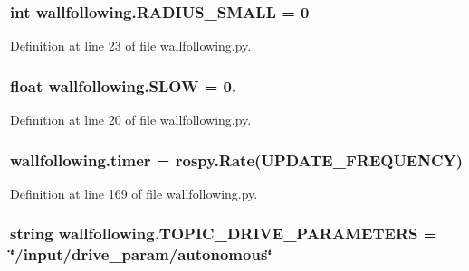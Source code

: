 \subsubsection[{\texorpdfstring{R\+A\+D\+I\+U\+S\+\_\+\+S\+M\+A\+LL}{RADIUS_SMALL}}]{\setlength{\rightskip}{0pt plus 5cm}int wallfollowing.\+R\+A\+D\+I\+U\+S\+\_\+\+S\+M\+A\+LL = 0}\hypertarget{namespacewallfollowing_aa59c6dfd10cb4f1550367b3268417436}{}\label{namespacewallfollowing_aa59c6dfd10cb4f1550367b3268417436}


Definition at line 23 of file wallfollowing.\+py.

\subsubsection[{\texorpdfstring{S\+L\+OW}{SLOW}}]{\setlength{\rightskip}{0pt plus 5cm}float wallfollowing.\+S\+L\+OW = 0.}\hypertarget{namespacewallfollowing_a30a4013dbd3a6ea5275fbed3fe35da22}{}\label{namespacewallfollowing_a30a4013dbd3a6ea5275fbed3fe35da22}


Definition at line 20 of file wallfollowing.\+py.

\subsubsection[{\texorpdfstring{timer}{timer}}]{\setlength{\rightskip}{0pt plus 5cm}wallfollowing.\+timer = rospy.\+Rate({\bf U\+P\+D\+A\+T\+E\+\_\+\+F\+R\+E\+Q\+U\+E\+N\+CY})}\hypertarget{namespacewallfollowing_a57288dd797e0bd15012f3ebf1670ce38}{}\label{namespacewallfollowing_a57288dd797e0bd15012f3ebf1670ce38}


Definition at line 169 of file wallfollowing.\+py.

\subsubsection[{\texorpdfstring{T\+O\+P\+I\+C\+\_\+\+D\+R\+I\+V\+E\+\_\+\+P\+A\+R\+A\+M\+E\+T\+E\+RS}{TOPIC_DRIVE_PARAMETERS}}]{\setlength{\rightskip}{0pt plus 5cm}string wallfollowing.\+T\+O\+P\+I\+C\+\_\+\+D\+R\+I\+V\+E\+\_\+\+P\+A\+R\+A\+M\+E\+T\+E\+RS = \char`\"{}/input/drive\+\_\+param/autonomous\char`\"{}}\hypertarget{namespacewallfollowing_a765ce45df7d0c3d9134fc83534029e36}{}\label{namespacewallfollowing_a765ce45df7d0c3d9134fc83534029e36}


